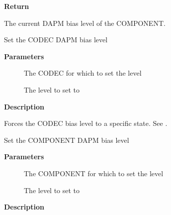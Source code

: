 \documentclass[a4paper,8pt,english]{sphinxmanual}
\begin{document}
\textbf{Return}

The current DAPM bias level of the COMPONENT.

\begin{fulllineitems}
\label{sound/kernel-api/alsa-driver-api:c.snd_soc_codec_force_bias_level}
Set the CODEC DAPM bias level

\end{fulllineitems}


\textbf{Parameters}
\begin{description}
\item[{}] \leavevmode
The CODEC for which to set the level

\item[{}] \leavevmode
The level to set to

\end{description}

\textbf{Description}

Forces the CODEC bias level to a specific state. See
{\hyperref[sound/kernel\string-api/alsa\string-driver\string-api:c.snd_soc_dapm_force_bias_level]{\emph{}}}.

\begin{fulllineitems}
\label{sound/kernel-api/alsa-driver-api:c.snd_soc_component_force_bias_level}
Set the COMPONENT DAPM bias level

\end{fulllineitems}


\textbf{Parameters}
\begin{description}
\item[{}] \leavevmode
The COMPONENT for which to set the level

\item[{}] \leavevmode
The level to set to

\end{description}

\textbf{Description}
\end{document}
